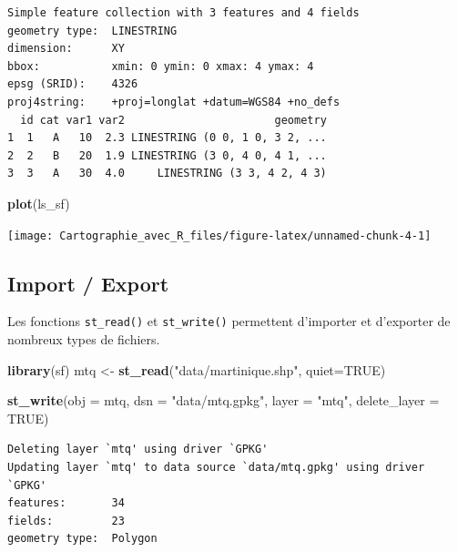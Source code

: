 \documentclass[]{book}
\newenvironment{Shaded}{\begin{snugshade}}{\end{snugshade}}
\newcommand{\KeywordTok}[1]{\textcolor[rgb]{0.13,0.29,0.53}{\textbf{#1}}}
\newcommand{\DataTypeTok}[1]{\textcolor[rgb]{0.13,0.29,0.53}{#1}}
\newcommand{\StringTok}[1]{\textcolor[rgb]{0.31,0.60,0.02}{#1}}
\newcommand{\OtherTok}[1]{\textcolor[rgb]{0.56,0.35,0.01}{#1}}
\newcommand{\NormalTok}[1]{#1}
\begin{document}
\begin{verbatim}
Simple feature collection with 3 features and 4 fields
geometry type:  LINESTRING
dimension:      XY
bbox:           xmin: 0 ymin: 0 xmax: 4 ymax: 4
epsg (SRID):    4326
proj4string:    +proj=longlat +datum=WGS84 +no_defs
  id cat var1 var2                       geometry
1  1   A   10  2.3 LINESTRING (0 0, 1 0, 3 2, ...
2  2   B   20  1.9 LINESTRING (3 0, 4 0, 4 1, ...
3  3   A   30  4.0     LINESTRING (3 3, 4 2, 4 3)
\end{verbatim}

\begin{Shaded}
\begin{Highlighting}[]
\KeywordTok{plot}\NormalTok{(ls_sf)}
\end{Highlighting}
\end{Shaded}

\begin{center}\texttt{[image: Cartographie\_avec\_R\_files/figure-latex/unnamed-chunk-4-1]} \end{center}

\subsection{Import / Export}\label{import-export}

Les fonctions \texttt{st\_read()} et \texttt{st\_write()} permettent
d'importer et d'exporter de nombreux types de fichiers.

\begin{Shaded}
\begin{Highlighting}[]
\KeywordTok{library}\NormalTok{(sf)}
\NormalTok{mtq <-}\StringTok{ }\KeywordTok{st_read}\NormalTok{(}\StringTok{"data/martinique.shp"}\NormalTok{, }\DataTypeTok{quiet=}\OtherTok{TRUE}\NormalTok{)}
\end{Highlighting}
\end{Shaded}

\begin{Shaded}
\begin{Highlighting}[]
\KeywordTok{st_write}\NormalTok{(}\DataTypeTok{obj =}\NormalTok{ mtq, }\DataTypeTok{dsn =} \StringTok{"data/mtq.gpkg"}\NormalTok{, }\DataTypeTok{layer =} \StringTok{"mtq"}\NormalTok{, }\DataTypeTok{delete_layer =} \OtherTok{TRUE}\NormalTok{)}
\end{Highlighting}
\end{Shaded}

\begin{verbatim}
Deleting layer `mtq' using driver `GPKG'
Updating layer `mtq' to data source `data/mtq.gpkg' using driver `GPKG'
features:       34
fields:         23
geometry type:  Polygon
\end{verbatim}
\end{document}
